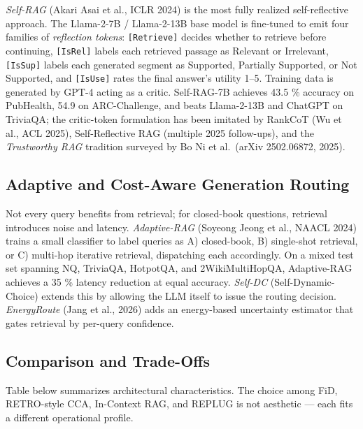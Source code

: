 \emph{Self-RAG} (Akari Asai et al., ICLR 2024) is the most fully realized self-reflective approach. The Llama-2-7B / Llama-2-13B base model is fine-tuned to emit four families of \emph{reflection tokens}: \texttt{{[}Retrieve{]}} decides whether to retrieve before continuing, \texttt{{[}IsRel{]}} labels each retrieved passage as Relevant or Irrelevant, \texttt{{[}IsSup{]}} labels each generated segment as Supported, Partially Supported, or Not Supported, and \texttt{{[}IsUse{]}} rates the final answer's utility 1--5. Training data is generated by GPT-4 acting as a critic. Self-RAG-7B achieves 43.5 \% accuracy on PubHealth, 54.9 on ARC-Challenge, and beats Llama-2-13B and ChatGPT on TriviaQA; the critic-token formulation has been imitated by RankCoT (Wu et al., ACL 2025), Self-Reflective RAG (multiple 2025 follow-ups), and the \emph{Trustworthy RAG} tradition surveyed by Bo Ni et al.~(arXiv 2502.06872, 2025).

\subsection{Adaptive and Cost-Aware Generation Routing}\label{adaptive-and-cost-aware-generation-routing}

Not every query benefits from retrieval; for closed-book questions, retrieval introduces noise and latency. \emph{Adaptive-RAG} (Soyeong Jeong et al., NAACL 2024) trains a small classifier to label queries as A) closed-book, B) single-shot retrieval, or C) multi-hop iterative retrieval, dispatching each accordingly. On a mixed test set spanning NQ, TriviaQA, HotpotQA, and 2WikiMultiHopQA, Adaptive-RAG achieves a 35 \% latency reduction at equal accuracy. \emph{Self-DC} (Self-Dynamic-Choice) extends this by allowing the LLM itself to issue the routing decision. \emph{EnergyRoute} (Jang et al., 2026) adds an energy-based uncertainty estimator that gates retrieval by per-query confidence.

\subsection{Comparison and Trade-Offs}\label{comparison-and-trade-offs}

Table below summarizes architectural characteristics. The choice among FiD, RETRO-style CCA, In-Context RAG, and REPLUG is not aesthetic --- each fits a different operational profile.

